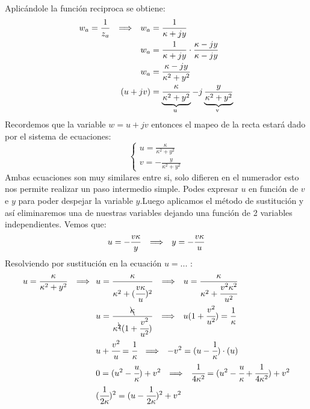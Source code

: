 Aplicándole la función reciproca se obtiene:
\begin{equation}
\begin{aligned}
      w_a=\frac{1}{z_a}\lrah w_a&=\frac{1}{\kappa+jy}\\
                             w_a&=\frac{1}{\kappa+jy}\cdot\frac{\kappa-jy}{\kappa-jy}\\
                              w_a&=\frac{\kappa-jy}{\kappa^2+y^2}\\
                               (u+jv)&=\underbrace{\frac{\kappa}{\kappa^2+y^2}}_\text{\clap{u~}}-j\underbrace{\frac{y}{\kappa^2+y^2}}_\text{\clap{v~}}\\
\end{aligned}
\end{equation}
Recordemos que la variable $w=u+jv$ entonces el mapeo de la recta estará dado por el sistema de ecuaciones:
\begin{equation}
    \begin{cases}
        u=\frac{\kappa}{\kappa^2+y^2}\\
        v=-\frac{y}{\kappa^2+y^2}
    \end{cases}
\end{equation}
Ambas ecuaciones son muy similares entre si, solo difieren en el numerador esto nos permite realizar un paso intermedio simple. Podes expresar $u$ en función de $v$ e $y$ para poder despejar la variable $y$.Luego aplicamos el método de sustitución y así eliminaremos una de nuestras variables dejando una función de 2 variables independientes. 
Vemos que:
\begin{equation}
     u=-\frac{v\kappa}{y} \hspace{0.25cm} \Longrightarrow \hspace{0.25cm} y=-\frac{v\kappa}{u}
\end{equation}
Resolviendo por sustitución en la ecuación $u=...$ :
\begin{equation}
    \begin{aligned}
        u=\frac{\kappa}{\kappa^2+y^2}\hspace{0.25cm} \Longrightarrow \hspace{0.25cm} &u=\frac{\kappa}{\kappa^2+(\cfrac{v\kappa}{u})^2}\hspace{0.25cm} \Longrightarrow \hspace{0.25cm} u=\frac{\kappa}{\kappa^2+\cfrac{v^2\kappa^2}{u^2}}\\
        &u=\frac{\bcancel{\kappa}}{\kappa^{\bcancel{2}}(1+\cfrac{v^2}{u^2})}\hspace{0.25cm} \Longrightarrow \hspace{0.25cm} u(1+\cfrac{v^2}{u^2})=\frac{1}{\kappa}\\
        &u+\cfrac{v^2}{u}=\cfrac{1}{\kappa}\hspace{0.25cm} \Longrightarrow \hspace{0.25cm} -v^2=(u-\cfrac{1}{\kappa})\cdot(u)\\
        &0=(u^2-\cfrac{u}{\kappa})+v^2\hspace{0.25cm} \Longrightarrow \hspace{0.25cm}\cfrac{1}{4\kappa^2}=(u^2-\cfrac{u}{\kappa}+\cfrac{1}{4\kappa^2})+v^2\\
        &(\cfrac{1}{2\kappa})^2=(u-\cfrac{1}{2\kappa})^2+v^2\\
        \label{eq:1/ZVer}
    \end{aligned}
\end{equation}
